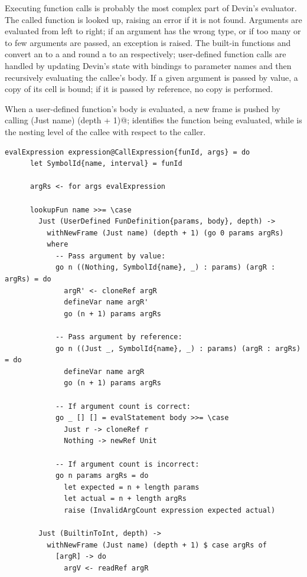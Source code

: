 \documentclass[UdineBachThesis,american,11pt]{PhdThesis}
\begin{document}
  \newpage

  Executing function calls is probably the most complex part of Devin's
  evaluator. The called function is looked up, raising an error if it is not
  found. Arguments are evaluated from left to right; if an argument has the
  wrong type, or if too many or to few arguments are passed, an exception is
  raised. The built-in functions \lstinline@toFloat@ and \lstinline@toInt@
  convert an \lstinline@Int@ to a \lstinline@Float@ and round a
  \lstinline@Float@ to an \lstinline@Int@ respectively; user-defined function
  calls are handled by updating Devin's state with bindings to parameter names
  and then recursively evaluating the callee's body. If a given argument is
  passed by value, a copy of its cell is bound; if it is passed by reference, no
  copy is performed.

  When a user-defined function's body is evaluated, a new frame is pushed by
  calling \lstinline@withNewFrame (Just name) (depth + 1)@; \lstinline@name@
  identifies the function being evaluated, while \lstinline@depth@ is the
  nesting level of the callee with respect to the caller.

  \begin{lstlisting}[gobble=4,basicstyle=\ttfamily\small]
    evalExpression expression@CallExpression{funId, args} = do
      let SymbolId{name, interval} = funId

      argRs <- for args evalExpression

      lookupFun name >>= \case
        Just (UserDefined FunDefinition{params, body}, depth) ->
          withNewFrame (Just name) (depth + 1) (go 0 params argRs)
          where
            -- Pass argument by value:
            go n ((Nothing, SymbolId{name}, _) : params) (argR : argRs) = do
              argR' <- cloneRef argR
              defineVar name argR'
              go (n + 1) params argRs

            -- Pass argument by reference:
            go n ((Just _, SymbolId{name}, _) : params) (argR : argRs) = do
              defineVar name argR
              go (n + 1) params argRs

            -- If argument count is correct:
            go _ [] [] = evalStatement body >>= \case
              Just r -> cloneRef r
              Nothing -> newRef Unit

            -- If argument count is incorrect:
            go n params argRs = do
              let expected = n + length params
              let actual = n + length argRs
              raise (InvalidArgCount expression expected actual)

        Just (BuiltinToInt, depth) ->
          withNewFrame (Just name) (depth + 1) $ case argRs of
            [argR] -> do
              argV <- readRef argR
  \end{lstlisting}
\end{document}
